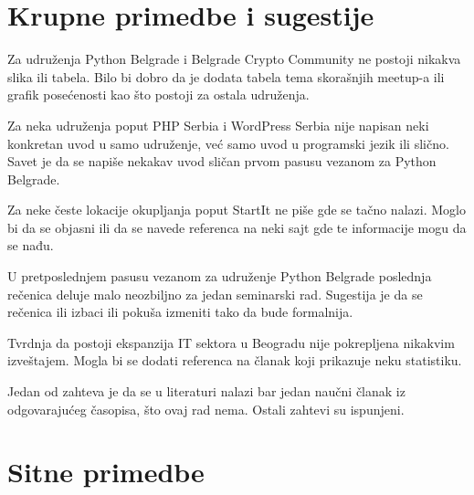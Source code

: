\documentclass[a4paper]{report}
\begin{document}
\section{Krupne primedbe i sugestije}

Za udruženja Python Belgrade i Belgrade Crypto Community ne postoji nikakva slika ili tabela. Bilo bi dobro da je dodata tabela tema skorašnjih meetup-a ili grafik posećenosti kao što postoji za ostala udruženja.

Za neka udruženja poput PHP Serbia i WordPress Serbia nije napisan neki konkretan uvod u samo udruženje, već samo uvod u programski jezik ili slično. Savet je da se napiše nekakav uvod sličan prvom pasusu vezanom za Python Belgrade.

Za neke česte lokacije okupljanja poput StartIt ne piše gde se tačno nalazi. Moglo bi da se objasni ili da se navede referenca na neki sajt gde te informacije mogu da se nađu.

U pretposlednjem pasusu vezanom za udruženje Python Belgrade poslednja rečenica deluje malo neozbiljno za jedan seminarski rad. Sugestija je da se rečenica ili izbaci ili pokuša izmeniti tako da bude formalnija.

Tvrdnja da postoji ekspanzija IT sektora u Beogradu nije pokrepljena nikakvim izveštajem. Mogla bi se dodati referenca na članak koji prikazuje neku statistiku.

Jedan od zahteva je da se u literaturi nalazi bar jedan naučni članak iz odgovarajućeg časopisa, što ovaj rad nema. Ostali zahtevi su ispunjeni.


\section{Sitne primedbe}
\end{document}
